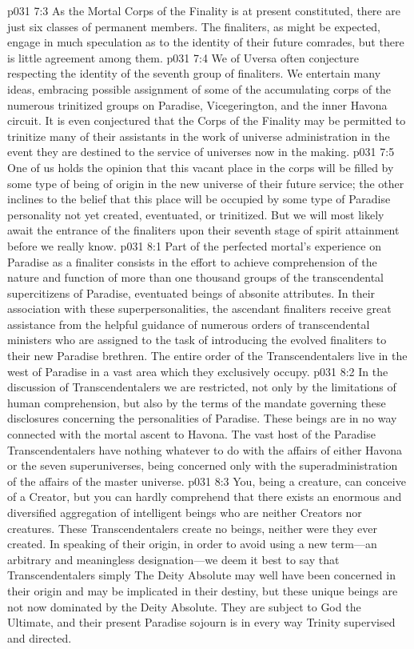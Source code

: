 \pc \vs p031 7:3 As the Mortal Corps of the Finality is at present constituted, there are just six classes of permanent members. The finaliters, as might be expected, engage in much speculation as to the identity of their future comrades, but there is little agreement among them.
\vs p031 7:4 We of Uversa often conjecture respecting the identity of the seventh group of finaliters. We entertain many ideas, embracing possible assignment of some of the accumulating corps of the numerous trinitized groups on Paradise, Vicegerington, and the inner Havona circuit. It is even conjectured that the Corps of the Finality may be permitted to trinitize many of their assistants in the work of universe administration in the event they are destined to the service of universes now in the making.
\vs p031 7:5 One of us holds the opinion that this vacant place in the corps will be filled by some type of being of origin in the new universe of their future service; the other inclines to the belief that this place will be occupied by some type of Paradise personality not yet created, eventuated, or trinitized. But we will most likely await the entrance of the finaliters upon their seventh stage of spirit attainment before we really know.
\vs p031 8:1 Part of the perfected mortal’s experience on Paradise as a finaliter consists in the effort to achieve comprehension of the nature and function of more than one thousand groups of the transcendental supercitizens of Paradise, eventuated beings of absonite attributes. In their association with these superpersonalities, the ascendant finaliters receive great assistance from the helpful guidance of numerous orders of transcendental ministers who are assigned to the task of introducing the evolved finaliters to their new Paradise brethren. The entire order of the Transcendentalers live in the west of Paradise in a vast area which they exclusively occupy.
\vs p031 8:2 In the discussion of Transcendentalers we are restricted, not only by the limitations of human comprehension, but also by the terms of the mandate governing these disclosures concerning the personalities of Paradise. These beings are in no way connected with the mortal ascent to Havona. The vast host of the Paradise Transcendentalers have nothing whatever to do with the affairs of either Havona or the seven superuniverses, being concerned only with the superadministration of the affairs of the master universe.
\vs p031 8:3 You, being a creature, can conceive of a Creator, but you can hardly comprehend that there exists an enormous and diversified aggregation of intelligent beings who are neither Creators nor creatures. These Transcendentalers create no beings, neither were they ever created. In speaking of their origin, in order to avoid using a new term---an arbitrary and meaningless designation---we deem it best to say that Transcendentalers simply  The Deity Absolute may well have been concerned in their origin and may be implicated in their destiny, but these unique beings are not now dominated by the Deity Absolute. They are subject to God the Ultimate, and their present Paradise sojourn is in every way Trinity supervised and directed.\plusone
